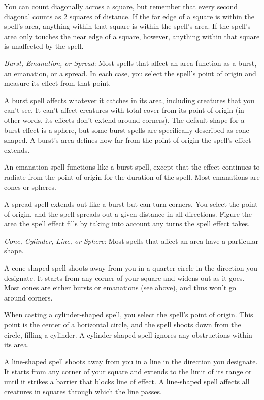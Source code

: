 You can count diagonally across a square, but remember that every second diagonal counts as 2 squares of distance. If the far edge of a square is within the spell's area, anything within that square is within the spell's area. If the spell's area only touches the near edge of a square, however, anything within that square is unaffected by the spell.
				
\textit{Burst, Emanation, or Spread}: Most spells that affect an area function as a burst, an emanation, or a spread. In each case, you select the spell's point of origin and measure its effect from that point.
				
A burst spell affects whatever it catches in its area, including creatures that you can't see. It can't affect creatures with total cover from its point of origin (in other words, its effects don't extend around corners). The default shape for a burst effect is a sphere, but some burst spells are specifically described as cone-shaped. A burst's area defines how far from the point of origin the spell's effect extends.
				
An emanation spell functions like a burst spell, except that the effect continues to radiate from the point of origin for the duration of the spell. Most emanations are cones or spheres.
				
A spread spell extends out like a burst but can turn corners. You select the point of origin, and the spell spreads out a given distance in all directions. Figure the area the spell effect fills by taking into account any turns the spell effect takes.
				
\textit{Cone, Cylinder, Line, or Sphere}: Most spells that affect an area have a particular shape.
				
A cone-shaped spell shoots away from you in a quarter-circle in the direction you designate. It starts from any corner of your square and widens out as it goes. Most cones are either bursts or emanations (see above), and thus won't go around corners.
				
When casting a cylinder-shaped spell, you select the spell's point of origin. This point is the center of a horizontal circle, and the spell shoots down from the circle, filling a cylinder. A cylinder-shaped spell ignores any obstructions within its area.
				
A line-shaped spell shoots away from you in a line in the direction you designate. It starts from any corner of your square and extends to the limit of its range or until it strikes a barrier that blocks line of effect. A line-shaped spell affects all creatures in squares through which the line passes.
				
